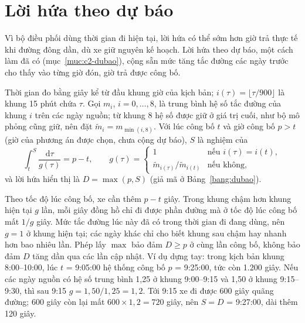 \section{Lời hứa theo dự báo}
\label{muc:dubao}

Vì bộ điều phối dùng thời gian đi hiện tại, lời hứa có thể sớm hơn giờ trả thực tế khi đường đông dần, dù xe giữ
nguyên kế hoạch. Lời hứa theo dự báo, một cách làm đã có (mục~\ref{muc:c2-dubao}), cộng sẵn mức tăng tắc đường các
ngày trước cho thấy vào từng giờ đón, giờ trả được công bố.

Thời gian đo bằng giây kể từ đầu khung giờ của kịch bản; $i(\tau) = \lfloor \tau / 900 \rfloor$ là khung 15 phút
chứa $\tau$. Gọi $m_i$, $i = 0, \ldots, 8$, là trung bình hệ số tắc đường của khung $i$ trên các ngày nguồn; từ
khung 8 hệ số được giữ ở giá trị cuối, như bộ mô phỏng cũng giữ, nên đặt $\tilde m_i = m_{\min(i, 8)}$. Với lúc
công bố $t$ và giờ công bố $p > t$ (giờ của phương án được chọn, chưa cộng dự báo), $S$ là nghiệm của
\begin{equation}
\int_{t}^{S} \frac{\mathrm{d}\tau}{g(\tau)} = p - t, \qquad
g(\tau) =
\begin{cases}
1 & \text{nếu } i(\tau) = i(t),\\
\tilde m_{i(\tau)} / \tilde m_{i(t)} & \text{nếu không,}
\end{cases}
\label{eq:keodan}
\end{equation}
và lời hứa hiển thị là $D = \max(p, S)$ (giả mã ở Bảng~\ref{bang:dubao}).

Theo tốc độ lúc công bố, xe cần thêm $p - t$ giây. Trong khung chậm hơn khung hiện tại $g$ lần, mỗi giây đồng hồ chỉ
đi được phần đường mà ở tốc độ lúc công bố mất $1/g$ giây. Mức tắc đường lúc này đã có trong thời gian đi đang dùng, nên $g = 1$ ở khung
hiện tại; các ngày khác chỉ cho biết khung sau chậm hay nhanh hơn bao nhiêu lần. Phép lấy $\max$ bảo đảm $D \ge p$ ở
cùng lần công bố, không bảo đảm $D$ tăng dần qua các lần cập nhật. Ví dụ dựng tay: trong kịch bản khung
8:00--10:00, lúc $t$ = 9:05:00 hệ thống công bố $p$ = 9:25:00, tức còn 1.200 giây. Nếu các ngày nguồn có hệ số trung
bình 1,25 ở khung 9:00--9:15 và 1,50 ở khung 9:15--9:30, thì sau 9:15 $g = 1{,}50/1{,}25 = 1{,}2$. Tới 9:15 xe đi
được 600 giây quãng đường; 600 giây còn lại mất $600 \times 1{,}2 = 720$ giây, nên $S = D$ = 9:27:00, dài thêm 120
giây.

